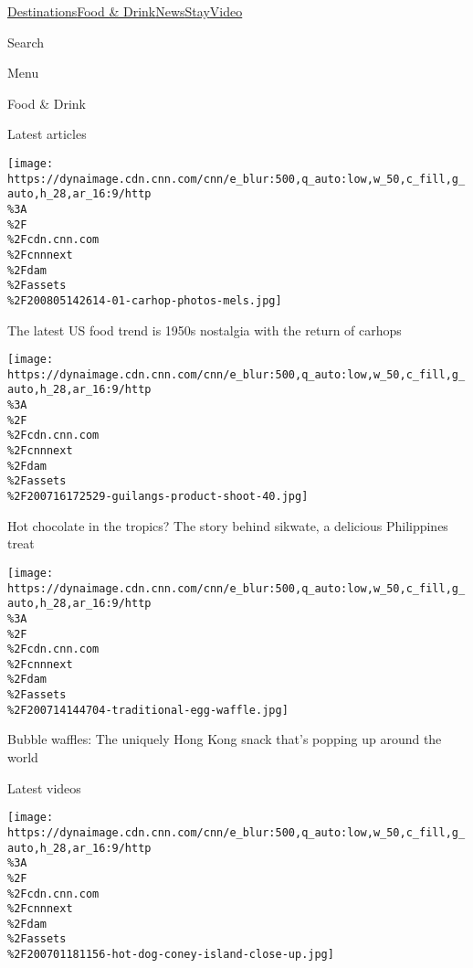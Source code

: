 \href{/}{}\href{/travel}{}

\href{/travel/destinations}{Destinations}\href{/travel/food-and-drink}{Food
\&
Drink}\href{/travel/news}{News}\href{/travel/stay}{Stay}\href{/travel/videos}{Video}

Search

Menu

Food \& Drink

Latest articles

\href{/travel/article/carhops-us-dining-trend-1950s/index.html}{}

\texttt{[image: https://dynaimage.cdn.cnn.com/cnn/e\_blur:500,q\_auto:low,w\_50,c\_fill,g\_auto,h\_28,ar\_16:9/http\\\%3A\\\%2F\\\%2Fcdn.cnn.com\\\%2Fcnnnext\\\%2Fdam\\\%2Fassets\\\%2F200805142614-01-carhop-photos-mels.jpg]}

\href{/travel/article/carhops-us-dining-trend-1950s/index.html}{}

The latest US food trend is 1950s nostalgia with the return of carhops

\href{/travel/article/philippines-sikwate-chocolate/index.html}{}

\texttt{[image: https://dynaimage.cdn.cnn.com/cnn/e\_blur:500,q\_auto:low,w\_50,c\_fill,g\_auto,h\_28,ar\_16:9/http\\\%3A\\\%2F\\\%2Fcdn.cnn.com\\\%2Fcnnnext\\\%2Fdam\\\%2Fassets\\\%2F200716172529-guilangs-product-shoot-40.jpg]}

\href{/travel/article/philippines-sikwate-chocolate/index.html}{}

Hot chocolate in the tropics? The story behind sikwate, a delicious
Philippines treat

\href{/travel/article/hong-kong-bubble-waffles/index.html}{}

\texttt{[image: https://dynaimage.cdn.cnn.com/cnn/e\_blur:500,q\_auto:low,w\_50,c\_fill,g\_auto,h\_28,ar\_16:9/http\\\%3A\\\%2F\\\%2Fcdn.cnn.com\\\%2Fcnnnext\\\%2Fdam\\\%2Fassets\\\%2F200714144704-traditional-egg-waffle.jpg]}

\href{/travel/article/hong-kong-bubble-waffles/index.html}{}

Bubble waffles: The uniquely Hong Kong snack that's popping up around
the world

Latest videos

\href{/travel/videos/travel/2020/07/01/hot-dog-nathans-coney-island-travel-orig.cnn}{}

\texttt{[image: https://dynaimage.cdn.cnn.com/cnn/e\_blur:500,q\_auto:low,w\_50,c\_fill,g\_auto,h\_28,ar\_16:9/http\\\%3A\\\%2F\\\%2Fcdn.cnn.com\\\%2Fcnnnext\\\%2Fdam\\\%2Fassets\\\%2F200701181156-hot-dog-coney-island-close-up.jpg]}

